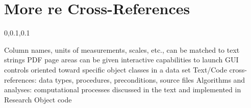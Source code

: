 
\section{More re Cross-References}\fbeg{}\begin{frame}{}

\vspace{2pt}	

{\hspace*{21pt}\begin{minipage}[c]{.9\textwidth}\begin{center}
{}
\end{center}\end{minipage}}
	
\vspace*{11pt}	

{\Large{}\selectfont

\hspace*{20pt}\begin{minipage}{.96\textwidth}
\vspace{4pt}
		
\begin{lightquadblockc}{0,0.1,0.1}{\parbox{21cm}{\centering \vspace{3pt}}}
\begin{center}\begin{minipage}{\textwidth}
{\Huge \setlength{\leftmargini}{30pt}\begin{enumerate}
\dmitem {\dsp} Column names, units of measurements, scales, etc., can be matched to text strings 
\vspace{20pt}
\dmitem {\dsp} PDF page areas can be given interactive capabilities to launch GUI controls 
oriented toward specific object classes in a data set
\vspace{20pt}
\dmitem {\dsp} Text/Code cross-references: data types, procedures, preconditions, source files
\vspace{20pt}
\dmitem {\dsp} Algorithms and analyses: computational processes discussed in the text and 
implemented in Research Object code
\vspace{20pt}
\end{enumerate}
}\end{minipage}
\end{center}
\end{lightquadblockc}
\end{minipage}

}

\end{frame}

